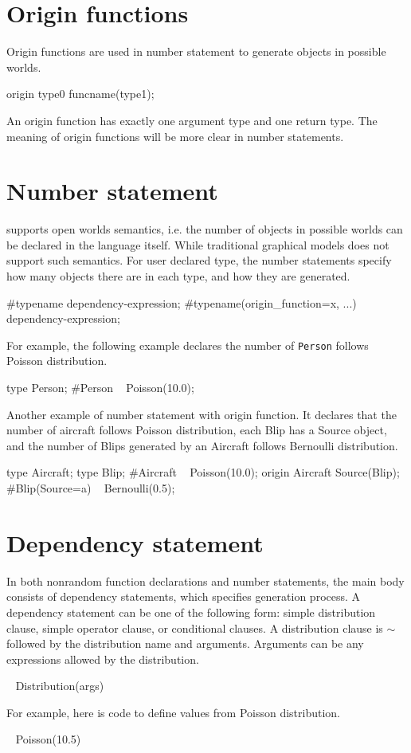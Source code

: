 \documentclass[12pt]{article}
\begin{document}
\section{Origin functions}
Origin functions are used in number statement to generate objects in possible worlds. 
\begin{blogcode}
origin type0 funcname(type1);
\end{blogcode}
An origin function has exactly one argument type and one return type. 
The meaning of origin functions will be more clear in number statements. 

\section{Number statement}
\bl supports open worlds semantics, i.e. the number of objects in possible worlds can be declared in the language itself. While traditional graphical models does not support such semantics. 
For user declared type, the number statements specify how many objects there are in each type, and how they are generated. 
\begin{blogcode}
#typename dependency-expression;
#typename(origin_function=x, ...) dependency-expression;
\end{blogcode}

For example, the following example declares the number of \texttt{Person} follows Poisson distribution. 
\begin{blogcode}
type Person;
#Person ~ Poisson(10.0);
\end{blogcode}

Another example of number statement with origin function. It declares that the number of aircraft follows Poisson distribution, each Blip has a Source object, and the number of Blips generated by an Aircraft follows Bernoulli distribution.
\begin{blogcode}
type Aircraft;
type Blip;
#Aircraft ~ Poisson(10.0); 
origin Aircraft Source(Blip);
#Blip(Source=a) ~ Bernoulli(0.5);
\end{blogcode}

\section{Dependency statement}
In both nonrandom function declarations and number statements, the main body consists of dependency statements, which specifies generation process. 
A dependency statement can be one of the following form: simple distribution clause, simple operator clause, or conditional clauses.
A distribution clause is $\sim$ followed by the distribution name and arguments. Arguments can be any expressions allowed by the distribution.  
\begin{blogcode}
~ Distribution(args)
\end{blogcode} 
For example, here is code to define values from Poisson distribution.
\begin{blogcode}
~ Poisson(10.5)
\end{blogcode}
\end{document}

